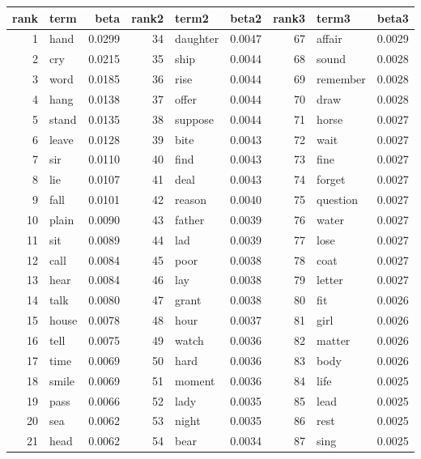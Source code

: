 \begin{table}[ht]
\centering
\begin{tabular}{rlrrlrrlr}
  \hline
rank & term & beta & rank2 & term2 & beta2 & rank3 & term3 & beta3 \\ 
  \hline
1 & hand & 0.0299 & 34 & daughter & 0.0047 & 67 & affair & 0.0029 \\ 
  2 & cry & 0.0215 & 35 & ship & 0.0044 & 68 & sound & 0.0028 \\ 
  3 & word & 0.0185 & 36 & rise & 0.0044 & 69 & remember & 0.0028 \\ 
  4 & hang & 0.0138 & 37 & offer & 0.0044 & 70 & draw & 0.0028 \\ 
  5 & stand & 0.0135 & 38 & suppose & 0.0044 & 71 & horse & 0.0027 \\ 
  6 & leave & 0.0128 & 39 & bite & 0.0043 & 72 & wait & 0.0027 \\ 
  7 & sir & 0.0110 & 40 & find & 0.0043 & 73 & fine & 0.0027 \\ 
  8 & lie & 0.0107 & 41 & deal & 0.0043 & 74 & forget & 0.0027 \\ 
  9 & fall & 0.0101 & 42 & reason & 0.0040 & 75 & question & 0.0027 \\ 
  10 & plain & 0.0090 & 43 & father & 0.0039 & 76 & water & 0.0027 \\ 
  11 & sit & 0.0089 & 44 & lad & 0.0039 & 77 & lose & 0.0027 \\ 
  12 & call & 0.0084 & 45 & poor & 0.0038 & 78 & coat & 0.0027 \\ 
  13 & hear & 0.0084 & 46 & lay & 0.0038 & 79 & letter & 0.0027 \\ 
  14 & talk & 0.0080 & 47 & grant & 0.0038 & 80 & fit & 0.0026 \\ 
  15 & house & 0.0078 & 48 & hour & 0.0037 & 81 & girl & 0.0026 \\ 
  16 & tell & 0.0075 & 49 & watch & 0.0036 & 82 & matter & 0.0026 \\ 
  17 & time & 0.0069 & 50 & hard & 0.0036 & 83 & body & 0.0026 \\ 
  18 & smile & 0.0069 & 51 & moment & 0.0036 & 84 & life & 0.0025 \\ 
  19 & pass & 0.0066 & 52 & lady & 0.0035 & 85 & lead & 0.0025 \\ 
  20 & sea & 0.0062 & 53 & night & 0.0035 & 86 & rest & 0.0025 \\ 
  21 & head & 0.0062 & 54 & bear & 0.0034 & 87 & sing & 0.0025 \\ 

\end{tabular}
\end{table}
